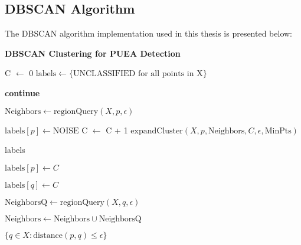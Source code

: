 \subsection{DBSCAN Algorithm}
\label{app:dbscan}

The DBSCAN algorithm implementation used in this thesis is presented below:

\begin{algorithm}[H]
\caption{\textbf{DBSCAN Clustering for PUEA Detection}}
\label{alg:dbscan}
\begin{algorithmic}[1]

    \State C $\gets$ 0 
    \State $\text{labels} \gets \{\text{UNCLASSIFIED for all points in X}\}$
    
            \State \textbf{continue}
        \EndIf
        
        \State $\text{Neighbors} \gets \text{regionQuery}(X, p, \epsilon)$
        
            \State $\text{labels}[p] \gets \text{NOISE}$
        \Else
            \State C $\gets$ C + 1
            \State $\text{expandCluster}(X, p, \text{Neighbors}, C, \epsilon, \text{MinPts})$
        \EndIf
    \EndFor
    
    \State \Return labels
\EndFunction

    \State $\text{labels}[p] \gets C$
    
            \State $\text{labels}[q] \gets C$
            
            \State $\text{NeighborsQ} \gets \text{regionQuery}(X, q, \epsilon)$
            
                \State $\text{Neighbors} \gets \text{Neighbors} \cup \text{NeighborsQ}$
            \EndIf
        \EndIf
    \EndFor
\EndFunction

    \State \Return $\{q \in X : \text{distance}(p, q) \leq \epsilon\}$
\EndFunction
\end{algorithmic}
\end{algorithm}

